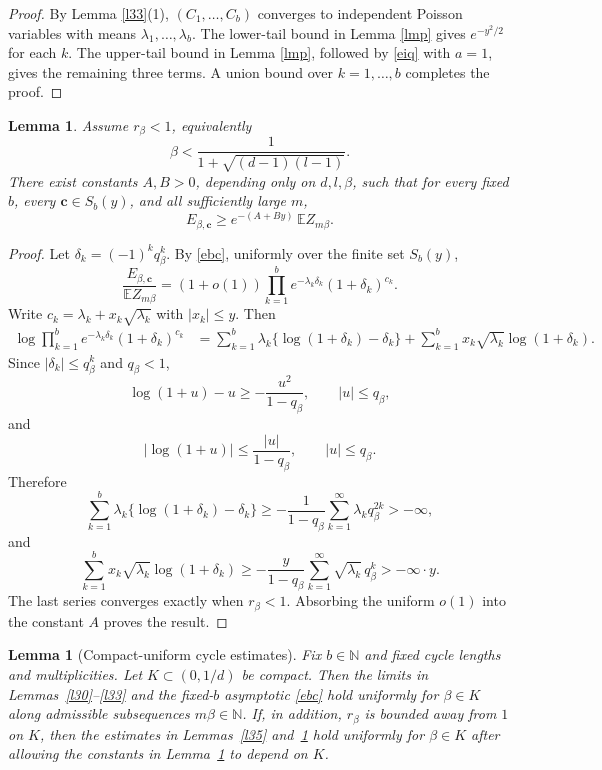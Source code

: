 \documentclass[11pt]{amsart}
\theoremstyle{plain}
\newtheorem{lemma}[theorem]{Lemma}
\numberwithin{equation}{section}
\numberwithin{theorem}{section}
\numberwithin{figure}{section}
\begin{document}
\begin{proof}
By Lemma \ref{l33}(1), \((C_1,\ldots,C_b)\) converges to independent Poisson
variables with means \(\lambda_1,\ldots,\lambda_b\).  The lower-tail bound in
Lemma \ref{lmp} gives \(e^{-y^2/2}\) for each \(k\).  The upper-tail bound in
Lemma \ref{lmp}, followed by \eqref{eiq} with \(a=1\), gives the remaining three
terms.  A union bound over \(k=1,\ldots,b\) completes the proof.
\end{proof}

\begin{lemma}\label{l38}
Assume \(r_\beta<1\), equivalently
\[
  \beta<\frac1{1+\sqrt{(d-1)(l-1)}}.
\]
There exist constants \(A,B>0\), depending only on \(d,l,\beta\), such that for
every fixed \(b\), every \(\mathbf c\in S_b(y)\), and all sufficiently large \(m\),
\[
  E_{\beta,\mathbf c}\ge e^{-(A+By)}\,\mathbb E Z_{m\beta}.
\]
\end{lemma}

\begin{proof}
Let \(\delta_k=(-1)^kq_\beta^k\).  By \eqref{ebc}, uniformly over the finite set
\(S_b(y)\),
\[
  \frac{E_{\beta,\mathbf c}}{\mathbb E Z_{m\beta}}
  =(1+o(1))\prod_{k=1}^b e^{-\lambda_k\delta_k}(1+\delta_k)^{c_k}.
\]
Write \(c_k=\lambda_k+x_k\sqrt{\lambda_k}\) with \(|x_k|\le y\).  Then
\begin{align*}
\log\prod_{k=1}^b e^{-\lambda_k\delta_k}(1+\delta_k)^{c_k}
&=\sum_{k=1}^b \lambda_k\{\log(1+\delta_k)-\delta_k\}
  +\sum_{k=1}^b x_k\sqrt{\lambda_k}\log(1+\delta_k).
\end{align*}
Since \(|\delta_k|\le q_\beta^k\) and \(q_\beta<1\),
\[
  \log(1+u)-u\ge -\frac{u^2}{1-q_\beta},\qquad |u|\le q_\beta,
\]
and
\[
  |\log(1+u)|\le \frac{|u|}{1-q_\beta},\qquad |u|\le q_\beta.
\]
Therefore
\[
\sum_{k=1}^b \lambda_k\{\log(1+\delta_k)-\delta_k\}
\ge -\frac1{1-q_\beta}\sum_{k=1}^{\infty}\lambda_k q_\beta^{2k}>-\infty,
\]
and
\[
\sum_{k=1}^b x_k\sqrt{\lambda_k}\log(1+\delta_k)
\ge -\frac{y}{1-q_\beta}
    \sum_{k=1}^{\infty}\sqrt{\lambda_k}\,q_\beta^k> -\infty\cdot y.
\]
The last series converges exactly when \(r_\beta<1\).  Absorbing the uniform
\(o(1)\) into the constant \(A\) proves the result.
\end{proof}

\begin{lemma}[Compact-uniform cycle estimates]\label{lem:cycle-uniformity}
Fix $b\in\mathbb N$ and fixed cycle lengths and multiplicities.  Let
$K\subset(0,1/d)$ be compact.  Then the limits in Lemmas~\ref{l30}--\ref{l33}
and the fixed-$b$ asymptotic \eqref{ebc} hold uniformly for
$\beta\in K$ along admissible subsequences $m\beta\in\mathbb N$.  If, in addition,
$r_\beta$ is bounded away from $1$ on $K$, then the estimates in Lemmas~\ref{l35}
and~\ref{l38} hold uniformly for $\beta\in K$ after allowing the constants in
Lemma~\ref{l38} to depend on $K$.
\end{lemma}
\end{document}

